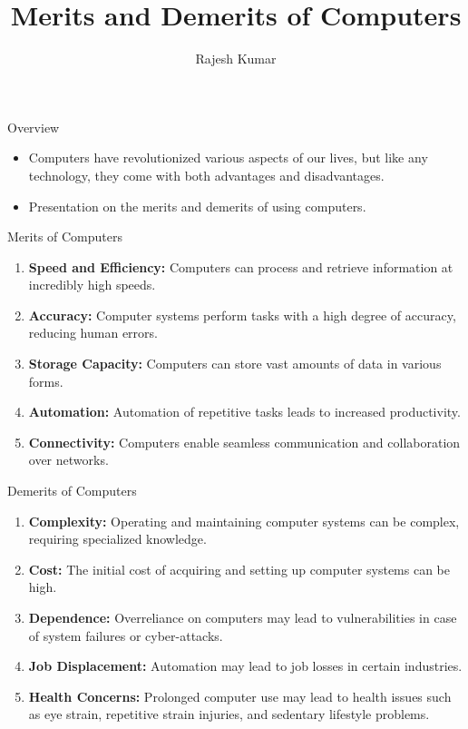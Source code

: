 \title{Merits and Demerits of Computers}
\author{Rajesh Kumar}
\date{}


\begin{frame}
  \titlepage
\end{frame}

\begin{frame}{Overview}
  \begin{itemize}
    \item Computers have revolutionized various aspects of our lives, but like any technology, they come with both advantages and disadvantages.
    \item Presentation on the merits and demerits of using computers.
  \end{itemize}
\end{frame}

\begin{frame}{Merits of Computers}
  \begin{enumerate}
    \item \textbf{Speed and Efficiency:} Computers can process and retrieve information at incredibly high speeds.
    \item \textbf{Accuracy:} Computer systems perform tasks with a high degree of accuracy, reducing human errors.
    \item \textbf{Storage Capacity:} Computers can store vast amounts of data in various forms.
    \item \textbf{Automation:} Automation of repetitive tasks leads to increased productivity.
    \item \textbf{Connectivity:} Computers enable seamless communication and collaboration over networks.
  \end{enumerate}
\end{frame}

\begin{frame}{Demerits of Computers}
  \begin{enumerate}
    \item \textbf{Complexity:} Operating and maintaining computer systems can be complex, requiring specialized knowledge.
    \item \textbf{Cost:} The initial cost of acquiring and setting up computer systems can be high.
    \item \textbf{Dependence:} Overreliance on computers may lead to vulnerabilities in case of system failures or cyber-attacks.
    \item \textbf{Job Displacement:} Automation may lead to job losses in certain industries.
    \item \textbf{Health Concerns:} Prolonged computer use may lead to health issues such as eye strain, repetitive strain injuries, and sedentary lifestyle problems.
  \end{enumerate}
\end{frame}

